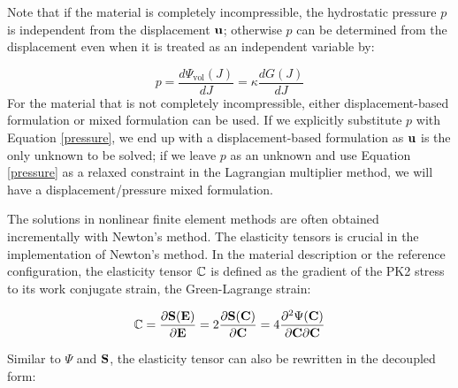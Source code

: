 Note that if the material is completely incompressible, the hydrostatic pressure $p$ is independent from the displacement $\bold{u}$; otherwise $p$ can be determined from the displacement even when it is treated as an independent variable by:

\begin{equation} \label{pressure}
p = \frac{d\Psi_\mathrm{vol}(J)}{dJ} = \kappa\frac{dG(J)}{dJ}
\end{equation}
For the material that is not completely incompressible, either displacement-based formulation or mixed formulation can be used. If we explicitly substitute $p$ with Equation \ref{pressure}, we end up with a displacement-based formulation as $\bold{u}$ is the only unknown to be solved; if we leave $p$ as an unknown and use Equation \ref{pressure} as a relaxed constraint in the Lagrangian multiplier method, we will have a displacement/pressure mixed formulation.

%
The solutions in nonlinear finite element methods are often obtained incrementally with Newton's method. The elasticity tensors is crucial in the implementation of Newton's method.
In the material description or the reference configuration, the elasticity tensor $\mathbb{C}$ is defined as the gradient of the PK2 stress to its work conjugate strain, the Green-Lagrange strain:

\begin{equation}
\mathbb{C} = \frac{\partial{\bold{S}(\bold{E})}}{\partial{\bold{E}}} =  2\frac{\partial{\bold{S}(\bold{C})}} {\partial{\bold{C}}} = 4 \frac{\partial^2{\Psi(\bold{C})}}{{\partial{\bold{C}}}{\partial{\bold{C}}}} \label{def_elasticity_tensor}
\end{equation}

Similar to $\Psi$ and $\bold{S}$, the elasticity tensor can also be rewritten in the decoupled form: 


